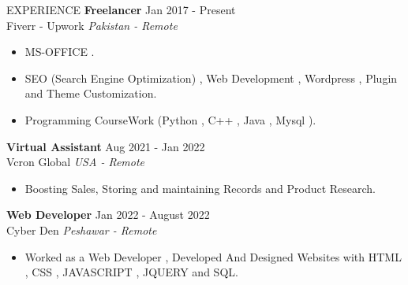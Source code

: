 \documentclass{resume}
\begin{document}
\begin{rSection}{EXPERIENCE}
\textbf{Freelancer} \hfill Jan 2017 - Present\\
Fiverr - Upwork \hfill \textit{Pakistan - Remote}
 \begin{itemize}
    \itemsep -3pt {} 
     \item MS-OFFICE .
     \item SEO (Search Engine Optimization) , Web Development , Wordpress , Plugin and Theme Customization.
    \item Programming CourseWork (Python , C++ , Java , Mysql ). 
 \end{itemize}

\textbf{Virtual Assistant} \hfill Aug 2021 - Jan 2022\\
Vcron Global \hfill \textit{USA - Remote}
 \begin{itemize}
    \itemsep -3pt {} 
     \item Boosting Sales, Storing and maintaining Records and  Product Research.
    
 \end{itemize}
 


 \textbf{Web Developer } \hfill Jan 2022 -  August 2022\\
Cyber Den \hfill \textit{Peshawar - Remote}
 \begin{itemize}
    \itemsep -3pt {} 
     \item Worked as a Web Developer , Developed And Designed Websites with HTML , CSS , JAVASCRIPT , JQUERY and SQL.
     
 \end{itemize}

\end{rSection} 

\end{document}
